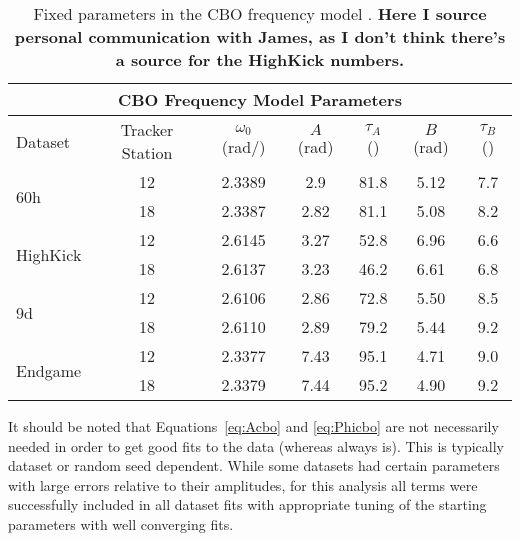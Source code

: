 \begin{table}[]
\centering
\small
\setlength\tabcolsep{10pt}
\renewcommand{\arraystretch}{1.2}
\begin{tabular*}{1\linewidth}{@{\extracolsep{\fill}}lcccccc}
  \hline
    \multicolumn{7}{c}{\textbf{CBO Frequency Model Parameters}} \\
  \hline\hline
    Dataset & Tracker Station & $\omega_{0}$ (rad/\mus{}) & $A$ (rad) & $\tau_{A}$ (\mus{}) & $B$ (rad) & $\tau_{B}$ (\mus{}) \\
  \hline
    \multirow{2}{*}{60h} & 12 & 2.3389 & 2.9 & 81.8 & 5.12 & 7.7 \\
                         & 18 & 2.3387 & 2.82 & 81.1 & 5.08 & 8.2 \\
  \hline
    \multirow{2}{*}{HighKick} & 12 & 2.6145 & 3.27 & 52.8 & 6.96 & 6.6 \\
                              & 18 & 2.6137 & 3.23 & 46.2 & 6.61 & 6.8 \\
  \hline
    \multirow{2}{*}{9d} & 12 & 2.6106 & 2.86 & 72.8 & 5.50 & 8.5 \\
                        & 18 & 2.6110 & 2.89 & 79.2 & 5.44 & 9.2 \\
  \hline
    \multirow{2}{*}{Endgame} & 12 & 2.3377 & 7.43 & 95.1 & 4.71 & 9.0 \\
                             & 18 & 2.3379 & 7.44 & 95.2 & 4.90 & 9.2 \\                                                        
  \hline
\end{tabular*}
\caption[Dataset CBO frequency model parameters]{Fixed parameters in the CBO frequency model \cite{CBOFreqTrackingElog,JamesPersonalComm}. \textbf{Here I source personal communication with James, as I don't think there's a source for the HighKick numbers.}}
\label{tab:CBOFrequencyParameters}
\end{table}


It should be noted that Equations~\ref{eq:Acbo} and \ref{eq:Phicbo} are not necessarily needed in order to get good fits to the data (whereas  always is). This is typically dataset or random seed dependent. While some datasets had certain parameters with large errors relative to their amplitudes, for this analysis all terms were successfully included in all dataset fits with appropriate tuning of the starting parameters with well converging fits. 


